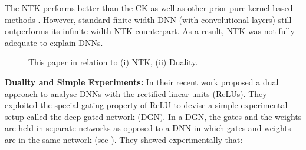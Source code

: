 The NTK performs better than the CK as well as other prior pure kernel based methods \cite{arora2019exact}. However, standard finite width DNN (with convolutional layers) still outperforms its infinite width NTK counterpart. As a result, NTK was not fully adequate to explain DNNs.
\begin{figure}
\caption{This paper in relation to (i) NTK, (ii) Duality.}
\label{fig:related}
\end{figure}

\textbf{Duality and Simple Experiments:} In their recent work \cite{npk} proposed a dual approach to analyse DNNs with the rectified linear units (ReLUs). They exploited the special gating property of ReLU to devise a simple experimental setup called the deep gated network (DGN). In a DGN, the gates and the weights are held in separate networks as opposed to a DNN in which gates and weights are in the same network (see ). They showed experimentally that:

